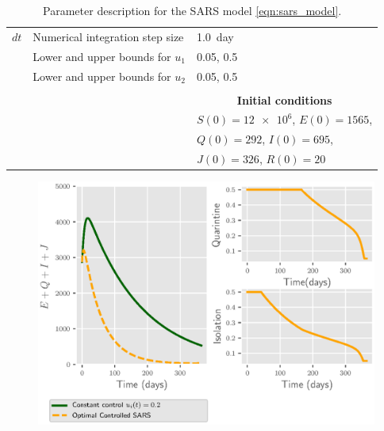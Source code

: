 \begin{table}[htb]
\begin{center}
\begin{tabular}{@{}rll@{}}
        $dt$
          & Numerical integration step size
          & \SI{1.0}{day}
        \\
          & Lower and upper bounds for $u_1$
          & \num{.05}, \num{0.5}
        \\
          & Lower and upper bounds for $u_2$
          & \num{.05}, \num{0.5}
        \\
        \\
         && \multicolumn{1}{c}{\bf{Initial conditions}}
        \\
         \cmidrule{3-3}
         && $S(0)=\num{12e6}$, $E(0)=1565$,
         \\
          && $Q(0)=292$, $I(0)=\num{695}$,
         \\
         && $J(0)=\num{326}$, $R(0)=\num{20}$
        \\
        \bottomrule
      \end{tabular}
     \caption{Parameter description for the SARS model
     \eqref{eqn:sars_model}.}
     \label{tbl:sars_table}
     \end{center}
\end{table}

\begin{figure}[htb]
  \centering
  \includegraphics{Figures/figure_1_sars}
  \caption{}
  \label{fig:figure1sars}
\end{figure}

